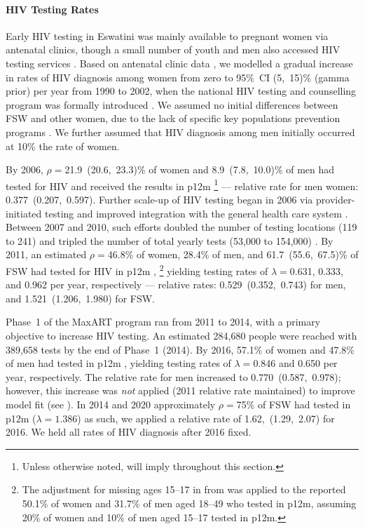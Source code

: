 \paragraph{HIV Testing Rates}
Early HIV testing in Eswatini was mainly available to pregnant women via antenatal clinics,
though a small number of youth and men also accessed HIV testing services \cite{EswHPC1998,HSRC2004}.
Based on antenatal clinic data \cite{EswUNGASS2010},
we modelled a gradual increase in rates of HIV diagnosis among women
from zero to 95\%~CI (5,~15)\% (gamma prior) per year from 1990 to 2002,
when the national HIV testing and counselling program was formally introduced \cite{NERCHA2012rep}.
We assumed no initial differences between FSW and other women,
due to the lack of specific key populations prevention programs \cite{EswNASA2006}.
We further assumed that HIV diagnosis among men initially occurred at 10\% the rate of women.
\par
By 2006, $\rho = {}$21.9~(20.6,~23.3)\% of women and 8.9~(7.8,~10.0)\% of men
had tested for HIV and received the results in p12m \cite{SDHS2006}%
\footnote{Unless otherwise noted,  will imply
   throughout this section.}
--- relative rate for men \vs women: 0.377~(0.207,~0.597).
Further scale-up of HIV testing began in 2006 via provider-initiated testing
and improved integration with the general health care system \cite{NERCHA2012rep}.
Between 2007 and 2010, such efforts
doubled the number of testing locations (119 to 241) and
tripled the number of total yearly tests (53,000 to 154,000) \cite{NERCHA2009nsf,NERCHA2012rep}.
By 2011, an estimated $\rho = {}$46.8\% of women, 28.4\% of men, and 61.7~(55.6,~67.5)\% of FSW
had tested for HIV in p12m \cite{SHIMS1T,Baral2014},%
\footnote{The adjustment for missing ages 15--17 in \cite{SHIMS1T} from 
  was applied to the reported 50.1\% of women and 31.7\% of men aged 18--49 who tested in p12m,
  assuming 20\% of women and 10\% of men aged 15--17 tested in p12m.}
yielding testing rates of $\lambda = {}$0.631, 0.333, and 0.962 per year, respectively
--- relative rates: 0.529~(0.352,~0.743) for men, and 1.521~(1.206,~1.980) for FSW.
\par
Phase~1 of the MaxART program \cite{MaxART1} ran from 2011 to 2014,
with a primary objective to increase HIV testing.
An estimated 284,680 people were reached with 389,658 tests by the end of Phase~1 (2014).
By 2016, 57.1\% of women and 47.8\% of men had tested in p12m \cite{SHIMS2},
yielding testing rates of $\lambda = {}$0.846 and 0.650 per year, respectively.
The relative rate for men increased to 0.770~(0.587,~0.978);
however, this increase was \emph{not} applied (2011 relative rate maintained)
to improve model fit (see ).
In 2014 \cite{EswKP2014} and 2020 \cite{EswIBBS2022}
approximately $\rho = {}$75\% of FSW had tested in p12m ($\lambda = 1.386$)
as such, we applied a relative rate of 1.62,~(1.29,~2.07) for 2016.
We held all rates of HIV diagnosis after 2016 fixed.
